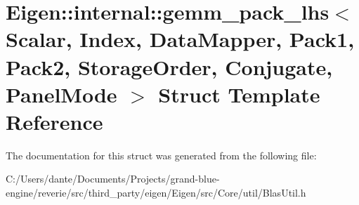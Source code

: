 \hypertarget{struct_eigen_1_1internal_1_1gemm__pack__lhs}{}\section{Eigen\+::internal\+::gemm\+\_\+pack\+\_\+lhs$<$ Scalar, Index, Data\+Mapper, Pack1, Pack2, Storage\+Order, Conjugate, Panel\+Mode $>$ Struct Template Reference}
\label{struct_eigen_1_1internal_1_1gemm__pack__lhs}


The documentation for this struct was generated from the following file\+:\begin{DoxyCompactItemize}
\item 
C\+:/\+Users/dante/\+Documents/\+Projects/grand-\/blue-\/engine/reverie/src/third\+\_\+party/eigen/\+Eigen/src/\+Core/util/Blas\+Util.\+h\end{DoxyCompactItemize}
